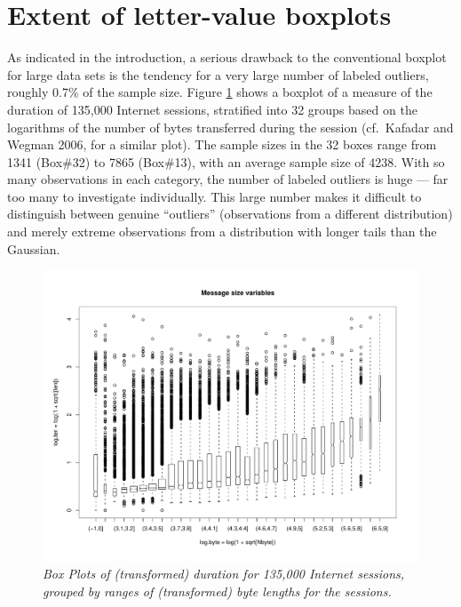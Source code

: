 \documentclass[11pt]{article}
\begin{document}
\clearpage

\section{Extent of letter-value boxplots}

As indicated in the introduction, a serious
drawback to the conventional boxplot for large
data sets is the tendency for a very large number
of labeled outliers, roughly 0.7\% of the sample size.  
Figure \ref{kkewbox} shows a boxplot of a measure of the 
duration of 135,000 Internet sessions, stratified
into 32 groups based on the logarithms of
the number of bytes transferred during the
session (cf.~Kafadar and Wegman 2006, for a similar plot).
The sample sizes in the 32 boxes range from 1341 (Box\#32)
to 7865 (Box\#13), with an average sample size of 4238.
With so many observations in each category,
the number of labeled outliers is huge --- far too 
many to investigate individually.  This large number
makes it difficult to distinguish between genuine
``outliers'' (observations from a different distribution)
and merely extreme observations from a distribution with
longer tails than the Gaussian.

\begin{figure}[hbt]
\begin{center}
\includegraphics[scale=.6,angle=270]{box2}
\caption{\it \label{kkewbox} Box Plots of (transformed)
duration for 135,000 Internet sessions, grouped by 
ranges of (transformed) byte lengths for the sessions.}
\end{center}
\end{figure}
\end{document}
